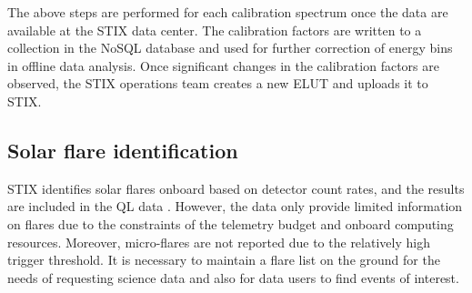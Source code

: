 \documentclass[referee]{aa} %
\begin{document}
The above steps are performed for each calibration spectrum once the data are available at the STIX data center. 
The calibration factors are written to a collection in the NoSQL database and used for further correction of energy bins in offline data analysis.   
Once significant changes in the calibration factors are observed, the STIX operations team creates a new ELUT and uploads it to STIX.

\subsection{Solar flare identification}
STIX identifies solar flares onboard based on detector count rates, and the results are included in the QL data \cite{stix2020}.  However,  the data only provide limited information on flares due to the constraints of the telemetry budget and onboard computing resources.  Moreover, micro-flares are not reported due to the relatively high trigger threshold.
It is necessary to maintain a flare list on the ground for the needs of requesting science data and also for data users to find events of interest. 
\end{document}
